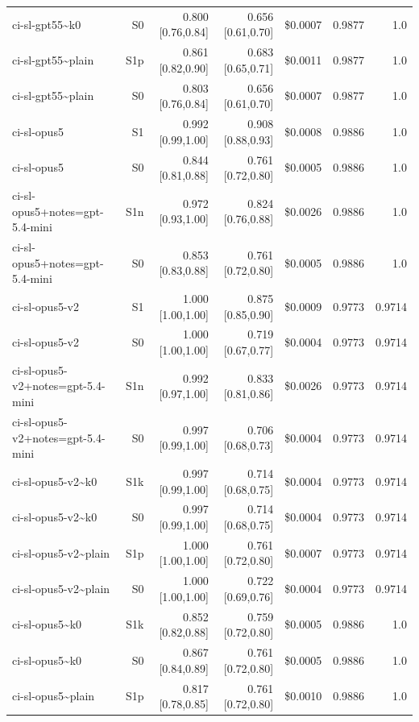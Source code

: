 \documentclass[11pt]{article}
\begin{document}
{\begin{longtable}{lrrrrrr}
ci-sl-gpt55\textasciitilde{}k0 & S0 & 0.800 [0.76,0.84] & 0.656 [0.61,0.70] & \$0.0007 & 0.9877 & 1.0 \\
ci-sl-gpt55\textasciitilde{}plain & S1p & 0.861 [0.82,0.90] & 0.683 [0.65,0.71] & \$0.0011 & 0.9877 & 1.0 \\
ci-sl-gpt55\textasciitilde{}plain & S0 & 0.803 [0.76,0.84] & 0.656 [0.61,0.70] & \$0.0007 & 0.9877 & 1.0 \\
ci-sl-opus5 & S1 & 0.992 [0.99,1.00] & 0.908 [0.88,0.93] & \$0.0008 & 0.9886 & 1.0 \\
ci-sl-opus5 & S0 & 0.844 [0.81,0.88] & 0.761 [0.72,0.80] & \$0.0005 & 0.9886 & 1.0 \\
ci-sl-opus5+notes=gpt-5.4-mini & S1n & 0.972 [0.93,1.00] & 0.824 [0.76,0.88] & \$0.0026 & 0.9886 & 1.0 \\
ci-sl-opus5+notes=gpt-5.4-mini & S0 & 0.853 [0.83,0.88] & 0.761 [0.72,0.80] & \$0.0005 & 0.9886 & 1.0 \\
ci-sl-opus5-v2 & S1 & 1.000 [1.00,1.00] & 0.875 [0.85,0.90] & \$0.0009 & 0.9773 & 0.9714 \\
ci-sl-opus5-v2 & S0 & 1.000 [1.00,1.00] & 0.719 [0.67,0.77] & \$0.0004 & 0.9773 & 0.9714 \\
ci-sl-opus5-v2+notes=gpt-5.4-mini & S1n & 0.992 [0.97,1.00] & 0.833 [0.81,0.86] & \$0.0026 & 0.9773 & 0.9714 \\
ci-sl-opus5-v2+notes=gpt-5.4-mini & S0 & 0.997 [0.99,1.00] & 0.706 [0.68,0.73] & \$0.0004 & 0.9773 & 0.9714 \\
ci-sl-opus5-v2\textasciitilde{}k0 & S1k & 0.997 [0.99,1.00] & 0.714 [0.68,0.75] & \$0.0004 & 0.9773 & 0.9714 \\
ci-sl-opus5-v2\textasciitilde{}k0 & S0 & 0.997 [0.99,1.00] & 0.714 [0.68,0.75] & \$0.0004 & 0.9773 & 0.9714 \\
ci-sl-opus5-v2\textasciitilde{}plain & S1p & 1.000 [1.00,1.00] & 0.761 [0.72,0.80] & \$0.0007 & 0.9773 & 0.9714 \\
ci-sl-opus5-v2\textasciitilde{}plain & S0 & 1.000 [1.00,1.00] & 0.722 [0.69,0.76] & \$0.0004 & 0.9773 & 0.9714 \\
ci-sl-opus5\textasciitilde{}k0 & S1k & 0.852 [0.82,0.88] & 0.759 [0.72,0.80] & \$0.0005 & 0.9886 & 1.0 \\
ci-sl-opus5\textasciitilde{}k0 & S0 & 0.867 [0.84,0.89] & 0.761 [0.72,0.80] & \$0.0005 & 0.9886 & 1.0 \\
ci-sl-opus5\textasciitilde{}plain & S1p & 0.817 [0.78,0.85] & 0.761 [0.72,0.80] & \$0.0010 & 0.9886 & 1.0 \\

\end{longtable}}
\end{document}
